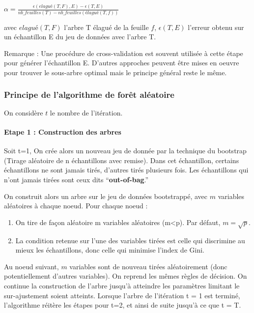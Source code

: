 \documentclass[
]{article}
\begin{document}
\(\alpha = \frac{\epsilon(elagué(T,F),E)-\epsilon(T,E)}{nb\_feuilles(T)-nb\_feuilles(élagué(T,f))}\)

avec \(elagué(T,F)\) l'arbre T élagué de la feuille \(f\),
\(\epsilon(T,E)\) l'erreur obtenu sur un échantillon E du jeu de données
avec l'arbre T.

Remarque : Une procédure de cross-validation est souvent utilisée à
cette étape pour générer l'échantillon E. D'autres approches peuvent
être mises en oeuvre pour trouver le sous-arbre optimal mais le principe
général reste le même.

\hypertarget{principe-de-lalgorithme-de-foruxeat-aluxe9atoire}{%
\subsubsection{Principe de l'algorithme de forêt
aléatoire}\label{principe-de-lalgorithme-de-foruxeat-aluxe9atoire}}

On considère \(t\) le nombre de l'itération.

\hypertarget{etape-1-construction-des-arbres}{%
\paragraph{Etape 1 : Construction des
arbres}\label{etape-1-construction-des-arbres}}

Soit t=1, On crée alors un nouveau jeu de donnée par la technique du
bootstrap (Tirage aléatoire de n échantillons avec remise). Dans cet
échantillon, certains échantillons ne sont jamais tirés, d'autres tirés
plusieurs fois. Les échantillons qui n'ont jamais tirées sont ceux dits
``\textbf{out-of-bag}.''

On construit alors un arbre sur le jeu de données bootstrappé, avec
\(m\) variables aléatoires à chaque noeud. Pour chaque noeud :

\begin{enumerate}
\def\labelenumi{\arabic{enumi}.}
\item
  On tire de façon aléatoire m variables aléatoires (m\textless p). Par
  défaut, \(m=\sqrt{p}\).
\item
  La condition retenue sur l'une des variables tirées est celle qui
  discrimine au mieux les échantillons, donc celle qui minimise l'index
  de Gini.
\end{enumerate}

Au noeud suivant, \(m\) variables sont de nouveau tirées aléatoirement
(donc potentiellement d'autres variables). On reprend les mêmes règles
de décision. On continue la construction de l'arbre jusqu'à atteindre
les paramètres limitant le sur-ajustement soient atteints. Lorsque
l'arbre de l'itération t = 1 est terminé, l'algorithme réitère les
étapes pour t=2, et ainsi de suite jusqu'à ce que t = T.
\end{document}
